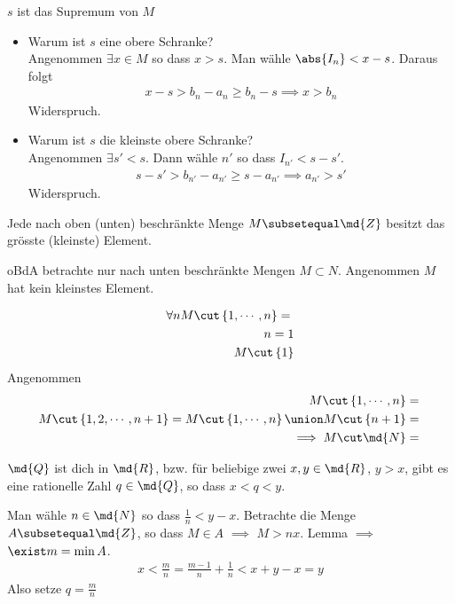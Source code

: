 \begin{Beh}
  $s$ ist das Supremum von $M$
  \begin{itemize}
    \item Warum ist $s$ eine obere Schranke? \\
    Angenommen $\exists x\in M$ so dass $x>s$. Man wähle $\abs{I_n}<x-s$. Daraus folgt
    \begin{align*}
      x-s>b_n-a_n \geq b_n-s \implies x>b_n
    \end{align*}
    Widerspruch.
  \item Warum ist $s$ die kleinste obere Schranke?\\
    Angenommen $\exists s'<s$. Dann wähle $n'$ so dass $I_{n'} <s-s'$.
    \begin{align*}
      s-s'>b_{n'}-a_{n'}\geq s-a_{n'} \implies a_{n'}>s'
    \end{align*}
    Widerspruch.
  \end{itemize}
\end{Beh}
\begin{Lem}
  Jede nach oben (unten) beschränkte Menge $M\subsetequal \md{Z}$ besitzt das grösste (kleinste) Element.
\end{Lem}
\begin{Bew}
  oBdA betrachte nur nach unten beschränkte Mengen $M\subset N$. Angenommen $M$ hat kein kleinstes Element.
\end{Bew}
\begin{Beh}
  \begin{align*}
    \forall n M\cut \left\{ 1,\cdots,n \right\} = \null\\
    n=1\\
    M\cut\left\{ 1 \right\}\\
  \end{align*}
  Angenommen
  \begin{align*}
    M\cut\left\{ 1,\cdots,n \right\} = \null\\
    M\cut\left\{ 1,2,\cdots,n+1 \right\} = M\cut \left\{ 1,\cdots,n \right\}\union M\cut\left\{ n+1 \right\}=\null\\
    \implies M\cut\md{N}=\null
  \end{align*}
\end{Beh}
\begin{Sat}
  $\md{Q}$ ist dich in $\md{R}$, bzw. für beliebige zwei $x,y\in\md{R}$, $y>x$, gibt es eine rationelle Zahl $q\in\md{Q}$, so dass $x<q<y$.
\end{Sat}
\begin{Bew}
  Man wähle $n\in\md{N}$ so dass $\frac{1}{n}<y-x$. Betrachte die Menge $A\subsetequal\md{Z}$, so dass $M\in A$ $\implies$ $M>nx$. Lemma $\implies$ $\exist m=\min A$.
  \begin{align*}
    x<\frac{m}{n}=\frac{m-1}{n}+\frac{1}{n}<x+y-x=y
  \end{align*}
  Also setze $q=\frac{m}{n}$
\end{Bew}
